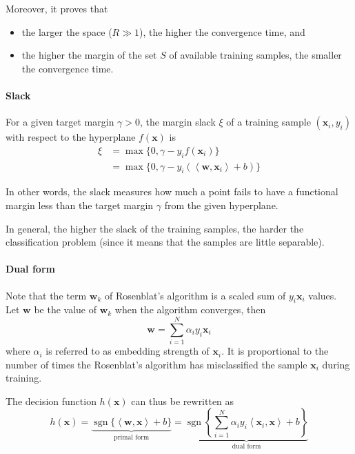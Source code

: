 \documentclass[oneside,onecolumn]{report}
\newcommand{\inp}[2]{\left\langle #1, #2 \right\rangle}
\DeclareMathOperator*{\sgn}{sgn}
\begin{document}
Moreover, it proves that
\begin{itemize}
    \item the larger the space ($R \gg 1$), the higher the convergence time, and
    \item the higher the margin of the set $S$ of available training samples, the smaller the convergence time.
\end{itemize}

\paragraph{Slack}
For a given target margin $\gamma > 0$, the margin slack $\xi$ of a training sample $(\bm x_i, y_i)$ with respect to the hyperplane $f(\bm x)$ is
\begin{align*}
\xi
&= \max\{ 0, \gamma - y_i f(\bm x_i) \} \\
&= \max\{ 0, \gamma - y_i (\inp{\bm w}{\bm x_i} + b) \}
\end{align*}

In other words, the slack measures how much a point fails to have a functional margin less than the target margin $\gamma$ from the given hyperplane.

In general, the higher the slack of the training samples, the harder the classification problem (since it means that the samples are little separable).

\paragraph{Dual form}
Note that the term $\bm w_k$ of Rosenblat's algorithm is a scaled sum of $y_i \bm x_i$ values.
Let $\bm w$ be the value of $\bm w_k$ when the algorithm converges, then
$$ \bm w = \sum_{i = 1}^N \alpha_i y_i \bm x_i $$
where $\alpha_i$ is referred to as embedding strength of $\bm x_i$.
It is proportional to the number of times the Rosenblat's algorithm has misclassified the sample $\bm x_i$ during training.

The decision function $h(\bm x)$ can thus be rewritten as
$$
h(\bm x)
= \underbrace{\sgn\{ \inp{\bm w}{\bm x} + b \}}_\text{primal form}
= \underbrace{\sgn \left\{ \sum_{i = 1}^N \alpha_i y_i \inp{\bm x_i}{\bm x} + b \right\}}_\text{dual form}
$$
\end{document}
